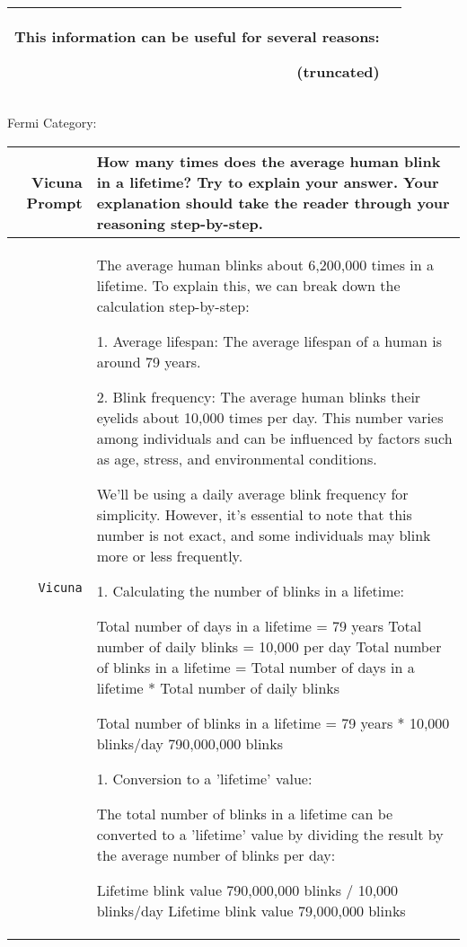 \documentclass{article}
\begin{document}
{{\begin{tabularx}{\linewidth}{r X}
This information can be useful for several reasons:

(truncated)
 \\
 \bottomrule
 \end{tabularx} }

\newpage
Fermi Category:

{  \footnotesize \begin{tabularx}{\linewidth}{r X} \toprule Vicuna Prompt  & {\bf How many times does the average human blink in a lifetime? Try to explain your answer. Your explanation should take the reader through your reasoning step-by-step.}
\\
 \midrule \texttt{Vicuna}  &
The average human blinks about 6,200,000 times in a lifetime. To explain this, we can break down the calculation step-by-step:

1. Average lifespan: The average lifespan of a human is around 79 years.

2. Blink frequency: The average human blinks their eyelids about 10,000 times per day. This number varies among individuals and can be influenced by factors such as age, stress, and environmental conditions.

We'll be using a daily average blink frequency for simplicity. However, it's essential to note that this number is not exact, and some individuals may blink more or less frequently.

1. Calculating the number of blinks in a lifetime:

Total number of days in a lifetime = 79 years
Total number of daily blinks = 10,000 per day
Total number of blinks in a lifetime = Total number of days in a lifetime * Total number of daily blinks

Total number of blinks in a lifetime = 79 years * 10,000 blinks/day  790,000,000 blinks

1. Conversion to a 'lifetime' value:

The total number of blinks in a lifetime can be converted to a 'lifetime' value by dividing the result by the average number of blinks per day:

Lifetime blink value  790,000,000 blinks / 10,000 blinks/day
Lifetime blink value  79,000,000 blinks


\end{tabularx}}}
\end{document}
